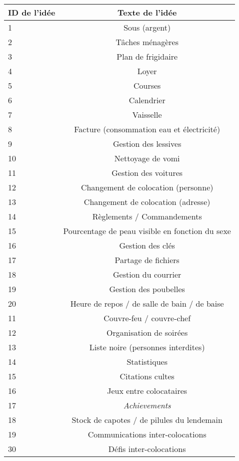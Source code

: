 \documentclass[a4paper, 12pt, french]{article}
\begin{document}
	\begin{longtable}{|l|c|}
 	\hline
  	ID de l'idée & Texte de l'idée \\ \hline
  	\hline
  	1 &  Sous (argent) \\ \hline
  	2 &  Tâches ménagères \\ \hline
  	3 &  Plan de frigidaire \\ \hline
  	4 &  Loyer \\ \hline
  	5 &  Courses \\ \hline
  	6 &  Calendrier \\ \hline
  	7 &  Vaisselle \\ \hline
  	8 &  Facture (consommation eau et électricité) \\ \hline
  	9 &  Gestion des lessives \\ \hline
  	10 &  Nettoyage de vomi \\ \hline
  	11 & Gestion des voitures \\ \hline
  	12 & Changement de colocation (personne) \\ \hline
  	13 & Changement de colocation (adresse) \\ \hline
  	14 & Règlements / Commandements \\ \hline
  	15 & Pourcentage de peau visible en fonction du sexe \\ \hline
  	16 & Gestion des clés \\ \hline
  	17 & Partage de fichiers \\ \hline
  	18 & Gestion du courrier \\ \hline
  	19 & Gestion des poubelles \\ \hline
  	20 & Heure de repos / de salle de bain / de baise \\ \hline
  	11 & Couvre-feu / couvre-chef \\ \hline
  	12 & Organisation de soirées \\ \hline
  	13 & Liste noire (personnes interdites) \\ \hline
  	14 & Statistiques \\ \hline
  	15 & Citations cultes \\ \hline
  	16 & Jeux entre colocataires \\ \hline
  	17 & \textit{Achievements} \\ \hline
  	18 & Stock de capotes / de pilules du lendemain \\ \hline
  	19 & Communications inter-colocations \\ \hline
  	30 & Défis inter-colocations \\ \hline

\end{longtable}
\end{document}
